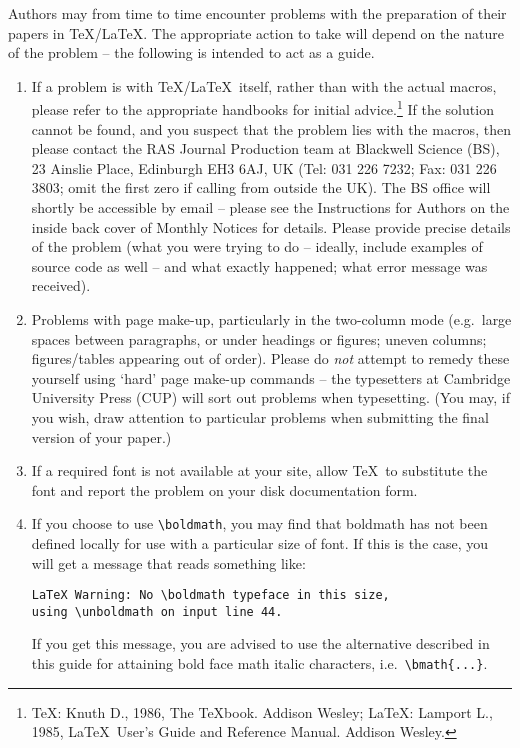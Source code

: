 Authors may from time to time encounter problems with the  preparation  
of their papers in \TeX/\LaTeX. The appropriate  action  to 
take will depend on the nature of the problem -- the following is 
intended to act as a guide.
%
\begin{enumerate}        
\item If a problem is with \TeX/\LaTeX\ itself, rather than with the 
actual macros, please refer to the appropriate handbooks for 
initial advice.\footnote{\TeX : Knuth D., 1986, The \TeX book. 
Addison Wesley; \LaTeX: Lamport L., 1985, \LaTeX\ User's Guide and 
Reference Manual. Addison Wesley.} If the 
solution cannot be found, and you suspect that the problem lies 
with the macros, then please contact the RAS Journal Production
team at Blackwell Science (BS), 23 Ainslie
Place, Edinburgh EH3 6AJ, UK (Tel: 031 226 7232; Fax: 031 226 3803;
omit the first zero if calling from outside the UK).
The BS office will shortly be
accessible by email -- please see the Instructions for Authors on 
the inside back cover of Monthly Notices for details. Please 
provide precise details of the problem (what you were trying to 
do -- ideally, include examples of source code as well -- and 
what exactly happened; what error message was received).
        
\item Problems with page make-up, particularly in the two-column 
mode (e.g.\ large spaces between paragraphs, or under headings or 
figures; uneven columns; figures/tables appearing out of order). 
Please do {\it not\/} attempt to remedy these yourself using `hard' page 
make-up commands -- the typesetters at Cambridge University Press 
(CUP) will sort out problems when typesetting. (You may, if you 
wish, draw attention to particular problems when submitting the 
final version of your paper.)
        
\item If a required font is not available at your site, allow \TeX\
to substitute the font and report the problem on your disk 
documentation form. 

\item If you choose to use \verb"\boldmath", you may find that boldmath has not been defined locally for use with a particular size of font. If this is the case, you will get a message that reads something like:
%
\begin{verbatim}
LaTeX Warning: No \boldmath typeface in this size, 
using \unboldmath on input line 44.
\end{verbatim}

If you get this message, you are advised to use the alternative described
in this guide for attaining bold face math italic characters,
i.e.\ \verb"\bmath{...}".
\end{enumerate}
        
